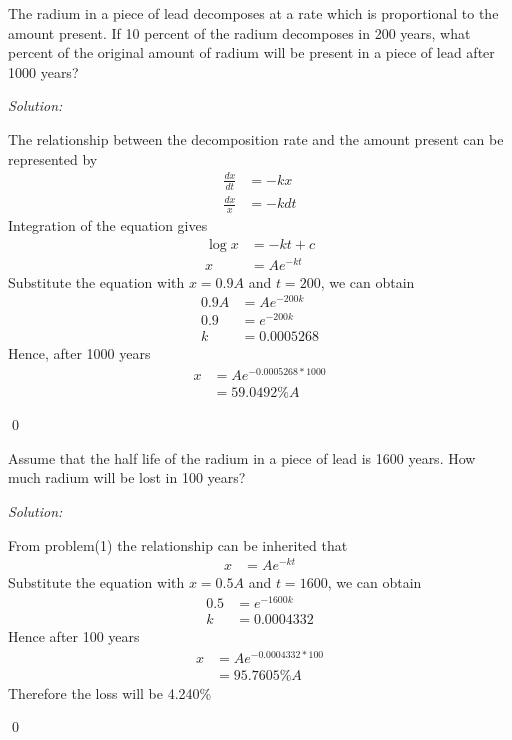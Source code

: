 \documentclass[12pt]{article}
\newenvironment{problem}[2][Problem]{\begin{trivlist}
\item[\hskip \labelsep {\bfseries #1}\hskip \labelsep {\bfseries #2.}]}{\end{trivlist}}
\newenvironment{sol}
    {\emph{Solution:}
    }
    {
    \qed
    }
\begin{document}




\begin{problem}{1} 
The radium in a piece of lead decomposes at a rate which is proportional to the amount present. If 10 percent of the radium decomposes in 200 years, what percent of the original amount of radium will be present in a piece of lead after 1000 years?
\end{problem}
\begin{sol}
The relationship between the decomposition rate and the amount present can be represented by
\begin{align*}
	\frac{dx}{dt} &= -kx \\
	\frac{dx}{x} &= -kdt
\end{align*}
Integration of the equation gives 
\begin{align*}
	\log x &= -kt + c \\
	x &= Ae^{-kt}
\end{align*}
Substitute the equation with $x = 0.9A$ and $t = 200$, we can obtain 
\begin{align*}
	0.9A &= Ae^{-200k} \\
	0.9  &= e^{-200k} \\
	k    &= 0.0005268
\end{align*}
Hence, after 1000 years
\begin{align*}
	x &= Ae^{-0.0005268*1000} \\
	  &= 59.0492\%A
\end{align*}
\end{sol}

\begin{problem}{2}
Assume that the half life of the radium in a piece of lead is 1600 years. How much radium will be lost in 100 years?
\end{problem}
\begin{sol}
From problem(1) the relationship can be inherited that 
\begin{align*}
	x &= Ae^{-kt}
\end{align*}
Substitute the equation with $x = 0.5A$ and $t = 1600$, we can obtain
\begin{align*}
	0.5 &= e^{-1600k} \\
	k   &= 0.0004332
\end{align*}
Hence after 100 years
\begin{align*}
	x &= Ae^{-0.0004332*100} \\
	  &= 95.7605\% A 
\end{align*}
Therefore the loss will be 4.240\%
\end{sol}
\end{document}
